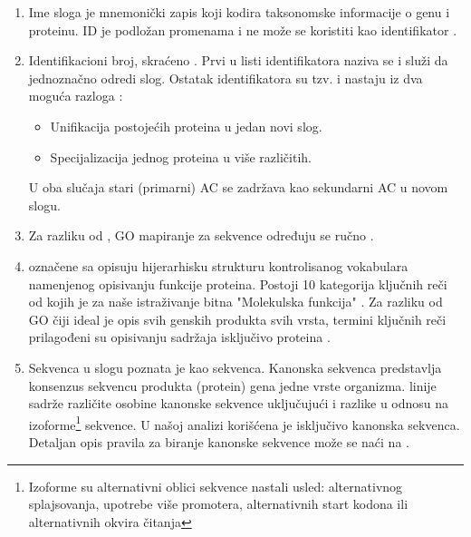 \begin{enumerate}
  \item Ime sloga   je mnemonički zapis koji kodira
    taksonomske informacije o genu i proteinu. ID je podložan promenama 
    i ne može se koristiti kao identifikator \parencite{www_uniprot}.
  \item Identifikacioni broj, skraćeno  .
    Prvi u listi identifikatora naziva se  i služi da
    jednoznačno odredi slog. Ostatak identifikatora su tzv.  i
    nastaju iz dva moguća razloga \parencite{svisprot2003, www_uniprot}:
    \begin{itemize}
      \item Unifikacija postojećih proteina u jedan novi slog. 
      \item Specijalizacija jednog proteina u više različitih.
    \end{itemize}
    U oba slučaja stari (primarni) AC se zadržava kao sekundarni AC u novom slogu.

  \item Za razliku od \trembl, GO mapiranje za \swissprot sekvence određuju se ručno \parencite{www_uniprot}.

  \item {}  označene sa  opisuju
    hijerarhisku strukturu kontrolisanog vokabulara namenjenog opisivanju
    funkcije proteina. Postoji 10 kategorija ključnih reči od kojih je za naše
    istraživanje bitna "Molekulska funkcija"  \parencite{svisprot2003}.  Za
    razliku od GO čiji ideal je opis svih genskih produkta svih vrsta, termini
    ključnih reči prilagođeni su opisivanju sadržaja isključivo \swissprot
    proteina \parencite{www_uniprot}.

  \item Sekvenca  u slogu poznata je kao 
     sekvenca. Kanonska sekvenca predstavlja konsenzus sekvencu
    produkta (protein) gena jedne vrste organizma.   linije sadrže
    različite osobine kanonske sekvence uključujući i razlike u odnosu na
    izoforme\footnote{Izoforme su alternativni oblici sekvence nastali usled:
    alternativnog splajsovanja, upotrebe više promotera, alternativnih start
  kodona ili alternativnih okvira čitanja } sekvence.  U našoj analizi
  korišćena je isključivo kanonska sekvenca. Detaljan opis pravila za biranje
  kanonske sekvence može se naći na \cite{www_uniprot}.


\end{enumerate}
